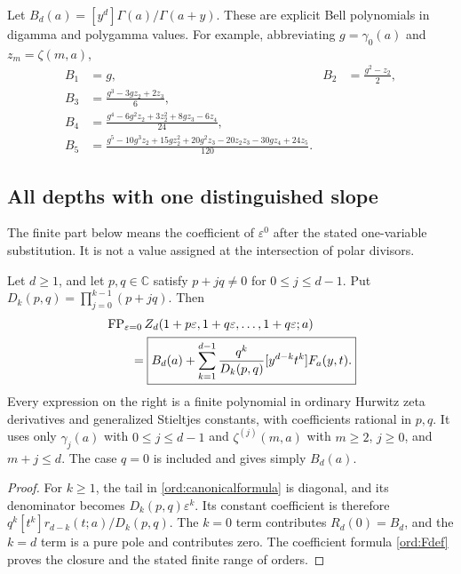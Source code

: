 Let $B_d(a)=[y^d]\Gamma(a)/\Gamma(a+y)$.
These are explicit Bell polynomials in digamma and polygamma values.
For example, abbreviating $g=\gamma_0(a)$ and $z_m=\zeta(m,a)$,
\begin{align*}
 B_1&=g,& B_2&=\frac{g^2-z_2}{2},\\
 B_3&=\frac{g^3-3gz_2+2z_3}{6},\\
 B_4&=\frac{g^4-6g^2z_2+3z_2^2+8gz_3-6z_4}{24},\\
 B_5&=\frac{g^5-10g^3z_2+15gz_2^2+20g^2z_3
                   -20z_2z_3-30gz_4+24z_5}{120}.
\end{align*}

\subsection{All depths with one distinguished slope}

The finite part below means the coefficient of $\varepsilon^0$ after
the stated one-variable substitution. It is not a value assigned at the
intersection of polar divisors.

\begin{theorem}
\label{ord:oneslope}
Let $d\ge1$, and let $p,q\in\mathbb C$ satisfy
$p+jq\ne0$ for $0\le j\le d-1$. Put
$D_k(p,q)=\prod_{j=0}^{k-1}(p+jq)$.
Then
\begin{align}\label{ord:oneslopeformula}
 &\operatorname{FP}_{\varepsilon=0}
 Z_d(1+p\varepsilon,1+q\varepsilon,\ldots,1+q\varepsilon;a)
 \notag\\
 &\qquad=\boxed{\displaystyle B_d(a)+
 \sum_{k=1}^{d-1}\frac{q^k}{D_k(p,q)}
                      [y^{d-k}t^k]F_a(y,t).}
\end{align}
Every expression on the right is a finite polynomial in ordinary
Hurwitz zeta derivatives and generalized Stieltjes constants, with
coefficients rational in $p,q$. It uses only $\gamma_j(a)$ with
$0\le j\le d-1$ and $\zeta^{(j)}(m,a)$ with
$m\ge2$, $j\ge0$, and $m+j\le d$.
The case $q=0$ is included and gives simply $B_d(a)$.
\end{theorem}

\begin{proof}
For $k\ge1$, the tail in \eqref{ord:canonicalformula} is diagonal,
and its denominator becomes $D_k(p,q)\varepsilon^k$.
Its constant coefficient is therefore
$q^k[t^k]r_{d-k}(t;a)/D_k(p,q)$. The $k=0$ term contributes
$R_d(0)=B_d$, and the $k=d$ term is a pure pole and contributes zero.
The coefficient formula \eqref{ord:Fdef} proves the closure and the
stated finite range of orders.
\end{proof}

